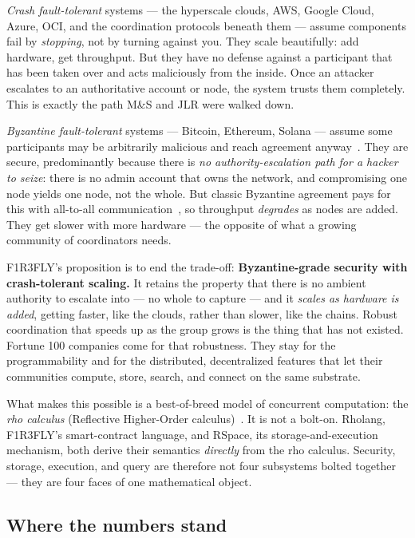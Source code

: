 \documentclass[11pt]{article}
\begin{document}
\emph{Crash fault-tolerant} systems --- the hyperscale clouds, AWS, Google Cloud, Azure, OCI, and the coordination protocols beneath them --- assume components fail by \emph{stopping}, not by turning against you. They scale beautifully: add hardware, get throughput. But they have no defense against a participant that has been taken over and acts maliciously from the inside. Once an attacker escalates to an authoritative account or node, the system trusts them completely. This is exactly the path M\&S and JLR were walked down.

\emph{Byzantine fault-tolerant} systems --- Bitcoin, Ethereum, Solana --- assume some participants may be arbitrarily malicious and reach agreement anyway~\cite{byzantine}. They are secure, predominantly because there is \emph{no authority-escalation path for a hacker to seize}: there is no admin account that owns the network, and compromising one node yields one node, not the whole. But classic Byzantine agreement pays for this with all-to-all communication~\cite{pbft}, so throughput \emph{degrades} as nodes are added. They get slower with more hardware --- the opposite of what a growing community of coordinators needs.

\begin{keybox}
F1R3FLY's proposition is to end the trade-off: \textbf{Byzantine-grade security with crash-tolerant scaling.} It retains the property that there is no ambient authority to escalate into --- no whole to capture --- and it \emph{scales as hardware is added}, getting faster, like the clouds, rather than slower, like the chains. Robust coordination that speeds up as the group grows is the thing that has not existed. Fortune 100 companies come for that robustness. They stay for the programmability and for the distributed, decentralized features that let their communities compute, store, search, and connect on the same substrate.
\end{keybox}

What makes this possible is a best-of-breed model of concurrent computation: the \emph{rho calculus} (Reflective Higher-Order calculus)~\cite{rho}. It is not a bolt-on. Rholang, F1R3FLY's smart-contract language, and RSpace, its storage-and-execution mechanism, both derive their semantics \emph{directly} from the rho calculus. Security, storage, execution, and query are therefore not four subsystems bolted together --- they are four faces of one mathematical object.

\subsection*{Where the numbers stand}
\end{document}
